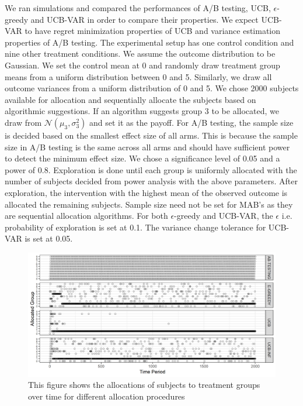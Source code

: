 \documentclass[12pt, letterpaper]{article}
\begin{document}
We ran simulations and compared the performances of A/B testing, UCB, $\epsilon$-greedy and UCB-VAR in order to compare their properties. We expect UCB-VAR to have regret minimization properties of UCB and variance estimation properties of A/B testing. The experimental setup has one control condition and nine other treatment conditions. We assume the outcome distribution to be Gaussian. We set the control mean at 0 and randomly draw treatment group means from a uniform distribution between 0 and 5. Similarly, we draw all outcome variances from a uniform distribution of 0 and 5. We chose 2000 subjects available for allocation and sequentially allocate the subjects based on algorithmic suggestions. If an algorithm suggests group 3 to be allocated, we draw from $\mathcal{N}(\mu_3,\sigma_3^2)$ and set it as the payoff.
For A/B testing, the sample size is decided based on the smallest effect size of all arms. This is because the sample size in A/B testing is the same across all arms and should have sufficient power to detect the minimum effect size. We chose a significance level of 0.05 and a power of 0.8. Exploration is done until each group is uniformly allocated with the number of subjects decided from power analysis with the above parameters. After exploration, the intervention with the highest mean of the observed outcome is allocated the remaining subjects. Sample size need not be set for MAB's as they are sequential allocation algorithms. For both $\epsilon$-greedy and UCB-VAR, the $\epsilon$ i.e. probability of exploration is set at 0.1. The variance change tolerance for UCB-VAR is set at 0.05.

\begin{figure}[h]
  \centering
    \includegraphics[width=\textwidth]{figs/group.png}
      \caption{This figure shows the allocations of subjects to treatment groups over time for different allocation procedures}
      \label{group}
\end{figure}
\end{document}
